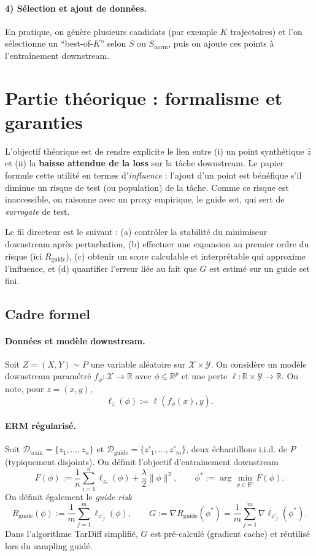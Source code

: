 \documentclass[11pt]{article}
\begin{document}
\paragraph{4) Sélection et ajout de données.}
En pratique, on génère plusieurs candidats (par exemple $K$ trajectoires) et l'on sélectionne un ``best-of-$K$'' selon $S$ ou $S_{\text{norm}}$, puis on ajoute ces points à l'entraînement downstream.



\section{Partie théorique : formalisme et garanties}
\label{sec:theory}
L'objectif théorique est de rendre explicite le lien entre (i) un point synthétique $\hat z$ et (ii) la \textbf{baisse attendue de la loss} sur la tâche downstream.
Le papier formule cette utilité en termes d'\emph{influence} : l'ajout d'un point est bénéfique s'il diminue un risque de test (ou population) de la tâche.
Comme ce risque est inaccessible, on raisonne avec un proxy empirique, le guide set, qui sert de \emph{surrogate} de test.

Le fil directeur est le suivant : (a) contrôler la stabilité du minimiseur downstream après perturbation, (b) effectuer une expansion au premier ordre du risque (ici $R_{\text{guide}}$), (c) obtenir un score calculable et interprétable qui approxime l'influence, et (d) quantifier l'erreur liée au fait que $G$ est estimé sur un guide set fini.

\subsection{Cadre formel}

\paragraph{Données et modèle downstream.}
Soit $Z=(X,Y)\sim P$ une variable aléatoire sur $\mathcal X\times\mathcal Y$.
On considère un modèle downstream paramétré $f_\phi:\mathcal X\to\mathbb R$ avec $\phi\in\mathbb R^p$ et une perte
$\ell:\mathbb R\times\mathcal Y\to\mathbb R$.
On note, pour $z=(x,y)$,
\[
\ell_z(\phi) := \ell(f_\phi(x),y).
\]

\paragraph{ERM régularisé.}
Soit $\mathcal D_{\text{train}}=\{z_1,\dots,z_n\}$ et $\mathcal D_{\text{guide}}=\{z'_1,\dots,z'_m\}$, deux échantillons i.i.d. de $P$ (typiquement disjoints).
On définit l'objectif d'entrainement downstream
\[
F(\phi) := \frac1n\sum_{i=1}^n \ell_{z_i}(\phi) + \frac{\lambda}{2}\|\phi\|^2,
\qquad
\phi^* := \arg\min_{\phi\in\mathbb R^p} F(\phi).
\]
On définit également le \emph{guide risk}
\[
R_{\text{guide}}(\phi):=\frac1m\sum_{j=1}^m \ell_{z'_j}(\phi),
\qquad
G := \nabla R_{\text{guide}}(\phi^*)= \frac1m\sum_{j=1}^m \nabla \ell_{z'_j}(\phi^*).
\]
Dans l'algorithme TarDiff simplifié, $G$ est pré-calculé (gradient cache) et réutilisé lors du sampling guidé.
\end{document}
